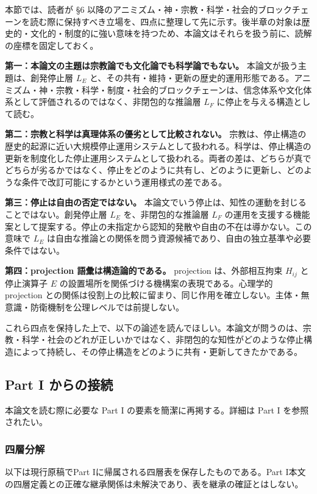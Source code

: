 本節では、読者が \S{}6 以降のアニミズム・神・宗教・科学・社会的ブロックチェーンを読む際に保持すべき立場を、四点に整理して先に示す。後半章の対象は歴史的・文化的・制度的に強い意味を持つため、本論文はそれらを扱う前に、読解の座標を固定しておく。

\textbf{第一：本論文の主題は宗教論でも文化論でも科学論でもない。}
本論文が扱う主題は、創発停止層 $L_E$ と、その共有・維持・更新の歴史的運用形態である。アニミズム・神・宗教・科学・制度・社会的ブロックチェーンは、信念体系や文化体系として評価されるのではなく、非閉包的な推論層 $L_F$ に停止を与える構造として読む。

\textbf{第二：宗教と科学は真理体系の優劣として比較されない。}
宗教は、停止構造の歴史的起源に近い大規模停止運用システムとして扱われる。科学は、停止構造の更新を制度化した停止運用システムとして扱われる。両者の差は、どちらが真でどちらが劣るかではなく、停止をどのように共有し、どのように更新し、どのような条件で改訂可能にするかという運用様式の差である。

\textbf{第三：停止は自由の否定ではない。}
本論文でいう停止は、知性の運動を封じることではない。創発停止層 $L_E$ を、非閉包的な推論層 $L_F$ の運用を支援する機能案として提案する。停止の未指定から認知的発散や自由の不在は導かない。この意味で $L_E$ は自由な推論との関係を問う資源候補であり、自由の独立基準や必要条件ではない。

\textbf{第四：projection 語彙は構造論的である。}
projection は、外部相互拘束 $H_{ij}$ と停止演算子 $E$ の設置場所を関係づける機構案の表現である。心理学的 projection との関係は役割上の比較に留まり、同じ作用を確立しない。主体・無意識・防衛機制を公理レベルでは前提しない。

これら四点を保持した上で、以下の論述を読んでほしい。本論文が問うのは、宗教・科学・社会のどれが正しいかではなく、非閉包的な知性がどのような停止構造によって持続し、その停止構造をどのように共有・更新してきたかである。

\bigskip


\subsection{Part I からの接続}


本論文を読む際に必要な Part I の要素を簡潔に再掲する。詳細は Part I を参照されたい。

\subsubsection{四層分解}


以下は現行原稿でPart Iに帰属される四層表を保存したものである。Part I本文の四層定義との正確な継承関係は未解決であり、表を継承の確証とはしない。

